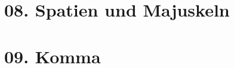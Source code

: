 \documentclass[handout,aspectratio=1610,dvipsnames]{beamer}
\begin{document}
  \section[Spatien\slash Majuskeln]{08. Spatien und Majuskeln}
  \let\woopsi\section\let\section\subsection\let\subsection\subsubsection
  
  \let\subsection\section\let\section\woopsi
  
  \section[Komma]{09. Komma}
  \let\woopsi\section\let\section\subsection\let\subsection\subsubsection
  
  \let\subsection\section\let\section\woopsi
  
\end{document}
